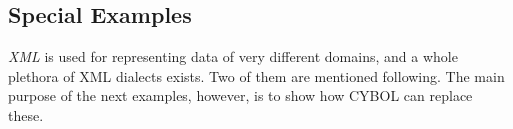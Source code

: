 %
%
%
%
%
%
%

\subsection{Special Examples}
\label{special_examples_heading}

\emph{XML} is used for representing data of very different domains, and a whole
plethora of XML dialects exists. Two of them are mentioned following. The main
purpose of the next examples, however, is to show how CYBOL can replace these.






